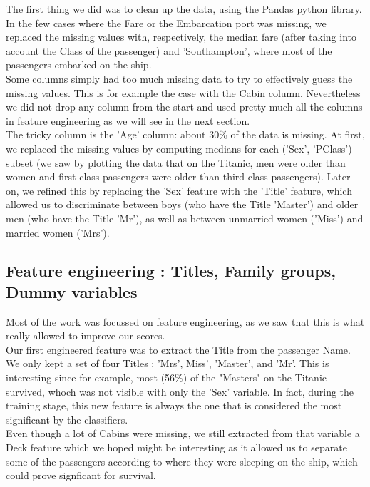\documentclass[a4paper,10pt]{article}
\begin{document}
The first thing we did was to clean up the data, using the Pandas python library. \\

In the few cases where the Fare or the Embarcation port was missing, we replaced the missing values with, respectively, the median fare (after taking into account the Class of the passenger) and 'Southampton', where most of the passengers embarked on the ship. \\

Some columns simply had too much missing data to try to effectively guess the missing values. This is for example the case with the Cabin column. Nevertheless we did not drop any column from the start and used pretty much all the columns in feature engineering as we will see in the next section. \\

The tricky column is the 'Age' column: about 30\% of the data is missing. At first, we replaced the missing values by computing medians for each ('Sex', 'PClass') subset (we saw by plotting the data that on the Titanic, men were older than women and first-class passengers were older than third-class passengers). Later on, we refined this by replacing the 'Sex' feature with the 'Title' feature, which allowed us to discriminate between boys (who have the Title 'Master') and older men (who have the Title 'Mr'), as well as between unmarried women ('Miss') and married women ('Mrs').

\subsection{Feature engineering : Titles, Family groups, Dummy variables}

Most of the work was focussed on feature engineering, as we saw that this is what really allowed to improve our scores. \\

Our first engineered feature was to extract the Title from the passenger Name. We only kept a set of four Titles : 'Mrs', Miss', 'Master', and 'Mr'. This is interesting since for example, most (56\%) of the "Masters" on the Titanic survived, whoch was not visible with only the 'Sex' variable. In fact, during the training stage, this new feature is always the one that is considered the most significant by the classifiers. \\

Even though a lot of Cabins were missing, we still extracted from that variable a Deck feature which we hoped might be interesting as it allowed us to separate some of the passengers according to where they were sleeping on the ship, which could prove signficant for survival. \\
\end{document}
